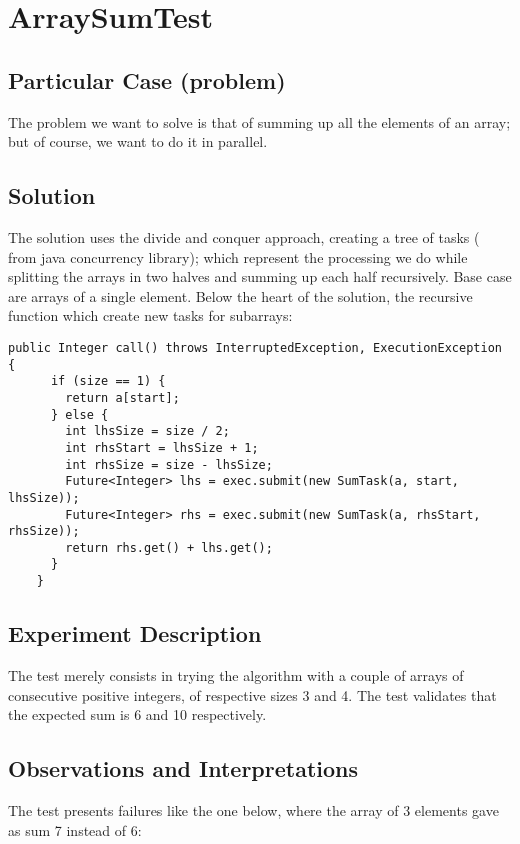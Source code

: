 \section{\textbf{ArraySumTest}}

\subsection{Particular Case (problem)}
The problem we want to solve is that of summing up all the elements of
an array; but of course, we want to do it in parallel.

\subsection{Solution}
The solution uses the divide and conquer approach, creating a tree of
tasks ( from java concurrency library); which represent
the processing we do while splitting the arrays in two halves and summing up
each half recursively. Base case are arrays of a single element. Below
the heart of the solution, the recursive function which create new tasks
for subarrays: \\

\begin{lstlisting}[style=numbers]
    public Integer call() throws InterruptedException, ExecutionException {
      if (size == 1) {
        return a[start];
      } else {
        int lhsSize = size / 2;
        int rhsStart = lhsSize + 1;
        int rhsSize = size - lhsSize;
        Future<Integer> lhs = exec.submit(new SumTask(a, start, lhsSize));
        Future<Integer> rhs = exec.submit(new SumTask(a, rhsStart, rhsSize));
        return rhs.get() + lhs.get();
      }
    }
\end{lstlisting}
\hfill

\subsection{Experiment Description}
The test merely consists in trying the algorithm with a couple of
arrays of consecutive positive integers, of respective sizes 3 and
4. The test validates that the expected sum is 6 and 10 respectively.

\subsection{Observations and Interpretations}
The test presents failures like the one below, where the array of 3
elements gave as sum 7 instead of 6: \\

